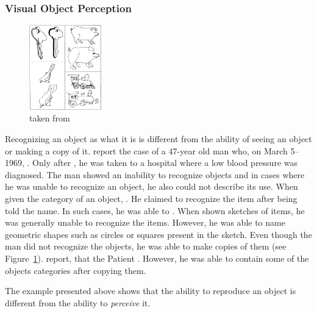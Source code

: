 \subsubsection{Visual Object Perception}\label{subsec:visual-object-perception}

\begin{figure}
    \begin{center}
        \includegraphics[width=0.28\textwidth]{images/rubens_sketches.jpg}
    \end{center}
    \caption[Copies of line drawings]{ taken from \citet{rubens1971associative}}
    \label{fig:copies_line_drawings}
\end{figure}
Recognizing an object as what it is is different from the ability of seeing an object or making a copy of it.
\citet{rubens1971associative} report the case of a 47-year old man who, on March 5--1969, .
Only after , he was taken to a hospital where a low blood pressure was diagnosed.
The man showed an inability to recognize objects and in cases where he was unable to recognize an object, he also could not describe its use.
When given the category of an object, .
He claimed to recognize the item after being told the name.
In such cases, he was able to .
When shown sketches of items, he was generally unable to recognize the items.
However, he was able to name geometric shapes such as circles or squares present in the sketch.
Even though the man did not recognize the objects, he was able to make copies of them (see Figure~\ref{fig:copies_line_drawings}).
\citet{rubens1971associative} report, that the Patient .
However, he was able to contain some of the objects categories after copying them.

The example presented above shows that the ability to reproduce an object is different from the ability to \textit{perceive} it.

